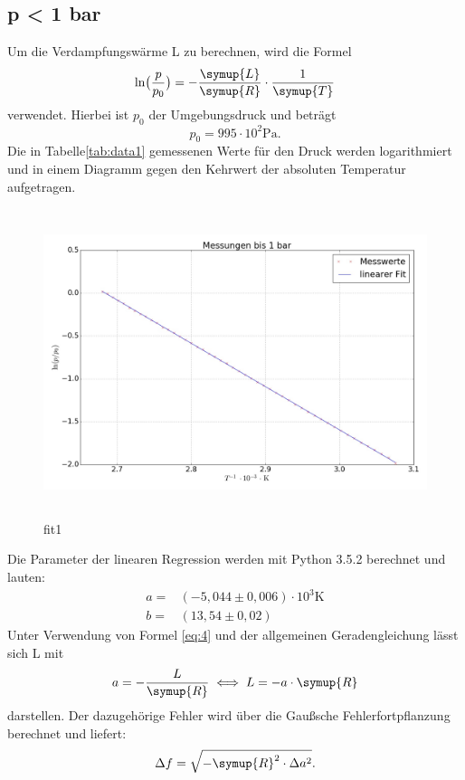 \subsection{p < 1 bar}
Um die Verdampfungswärme L zu berechnen, wird die Formel
\begin{equation*}
  \ln \bigl(\frac{p}{p_0}\bigr)=-\frac{\symup{L}}{\symup{R}} \cdot \frac{1}{\symup{T}}
\end{equation*}
verwendet. Hierbei ist $p_0$ der Umgebungsdruck und beträgt
\begin{equation*}
  p_0=995\cdot 10^2 \si{\pascal}.
\end{equation*}
Die in Tabelle\ref{tab:data1} gemessenen Werte für den Druck werden logarithmiert und in einem
Diagramm gegen den Kehrwert der absoluten Temperatur aufgetragen.

\begin{figure}[H]
  \centering
  \includegraphics[height=9cm , width=13.5cm]{fit1.jpg}
  \caption{fit1}
  \label{fig:fit1}
  \end{figure}
Die Parameter der linearen Regression werden mit Python 3.5.2 berechnet und
lauten:
\begin{align*}
  a =& (-5,044 \pm 0,006) \cdot 10^3 \si{\kelvin} \\
  b =& (13,54 \pm 0,02)
\end{align*}
Unter Verwendung von Formel \eqref{eq:4} und der allgemeinen Geradengleichung
lässt sich L mit
\begin{equation}
  a=-\frac{L}{\symup{R}} \iff L = -a \cdot \symup{R}
\end{equation}
darstellen. Der dazugehörige Fehler wird über die Gaußsche Fehlerfortpflanzung
berechnet und liefert:
\begin{equation}
  \Delta f = \sqrt{-\symup{R}^2 \cdot \Delta a^2}.
\end{equation}
